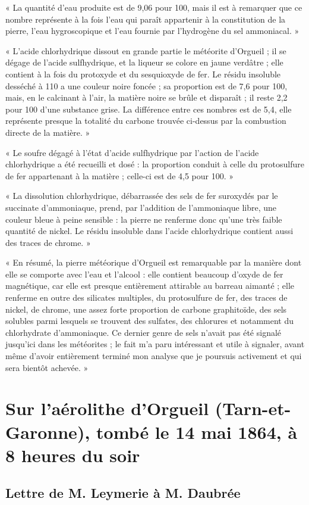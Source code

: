 \documentclass[a4paper, 11pt, oneside, polutonikogreek, french]{article}
\begin{document}
« La quantité d'eau produite est de 9,06 pour 100, mais il est à remarquer que ce nombre représente à la fois l'eau qui paraît appartenir à la constitution de la pierre, l'eau hygroscopique et l'eau fournie par l'hydrogène du sel ammoniacal. »

« L'acide chlorhydrique dissout en grande partie le météorite d'Orgueil ; il se dégage de l'acide sulfhydrique, et la liqueur se colore en jaune verdâtre ; elle contient à la fois du protoxyde et du sesquioxyde de fer. Le résidu insoluble desséché à 110 a une couleur noire foncée ; sa proportion est de 7,6 pour 100, mais, en le calcinant à l'air, la matière noire se brûle et disparaît ; il reste 2,2 pour 100 d'une substance grise. La différence entre ces nombres est de 5,4, elle représente presque la totalité du carbone trouvée ci-dessus par la combustion directe de la matière. »

« Le soufre dégagé à l'état d'acide sulfhydrique par l'action de l'acide chlorhydrique a été recueilli et dosé : la proportion conduit à celle du protosulfure de fer appartenant à la matière ; celle-ci est de 4,5 pour 100. »

« La dissolution chlorhydrique, débarrassée des sels de fer suroxydés par le succinate d'ammoniaque, prend, par l'addition de l'ammoniaque libre, une couleur bleue à peine sensible : la pierre ne renferme donc qu'une très faible quantité de nickel. Le résidu insoluble dans l'acide chlorhydrique contient aussi des traces de chrome. »

« En résumé, la pierre météorique d'Orgueil est remarquable par la manière dont elle se comporte avec l'eau et l'alcool : elle contient beaucoup d'oxyde de fer magnétique, car elle est presque entièrement attirable au barreau aimanté ; elle renferme en outre des silicates multiples, du protosulfure de fer, des traces de nickel, de chrome, une assez forte proportion de carbone graphitoïde, des sels solubles parmi lesquels se trouvent des sulfates, des chlorures et notamment du chlorhydrate d'ammoniaque. Ce dernier genre de sels n'avait pas été signalé jusqu'ici dans les météorites ; le fait m'a paru intéressant et utile à signaler, avant même d'avoir entièrement terminé mon analyse que je poursuis activement et qui sera bientôt achevée. »
\clearpage
\section{Sur l'aérolithe d'Orgueil (Tarn-et-Garonne), tombé le 14 mai 1864, à 8 heures du soir}
\subsection*{Lettre de M. Leymerie à M. Daubrée}
\end{document}
